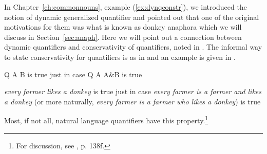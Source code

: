 In Chapter~\ref{ch:commonnouns}, example (\ref{ex:dynqconstr}), we
introduced the notion of dynamic generalized quantifier and pointed
out that one of the original motivations for them was what is known as
donkey anaphora which we will discuss in Section~\ref{sec:anaph}.
Here we will point out a connection between dynamic quantifiers and
conservativity of quantifiers, noted in \cite{Chierchia1995}.  The informal way to state
conservativity for quantifiers is as in  and an example is
given in .
\begin{ex} 
\begin{subex} 
 
\item Q A B is true just in case Q A A\&B is true 
 
\item \textit{every farmer likes a donkey} is true just in case
  \textit{every farmer is a farmer and likes a donkey} (or more
  naturally, \textit{every farmer is a farmer who likes a donkey}) is true
 
\end{subex} 
   
\end{ex} 
Most, if not all, natural language quantifiers have this
property.\footnote{For discussion, see \cite{PetersWesterstahl2006},
  p. 138f.}

